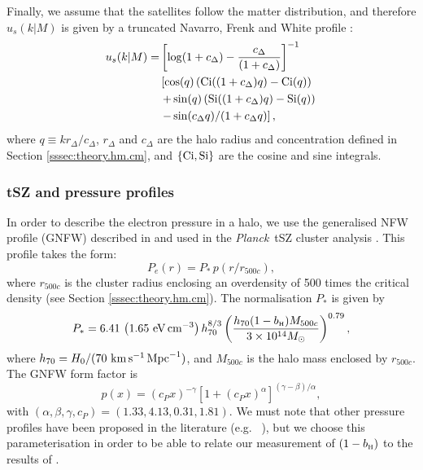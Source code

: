 \documentclass[useAMS,usenatbib]{mn2e}
\def\bH{b_{\scriptscriptstyle\rm H}}
\def\planck{{\it Planck\/}}
\def\citejap#1{\citeauthor{#1}\ \citeyear{#1}}
\begin{document}
      Finally, we assume that the satellites follow the matter distribution, and therefore $u_s(k|M)$ is given by a truncated Navarro, Frenk and White profile \citep{1996ApJ...462..563N}:
      \begin{align}
        u_s(k|M)=&\left[\log(1+c_\Delta)-\frac{c_\Delta}{(1+c_\Delta)}\right]^{-1}\\\nonumber
               &\left[\cos(q)\left({\rm Ci}((1+c_\Delta)q)-{\rm Ci}(q)\right)\right.\\\nonumber
               &\left.+\sin(q)\left({\rm Si}((1+c_\Delta)q)-{\rm Si}(q)\right)\right.\\\nonumber
               &\left.-\sin(c_\Delta q)/(1+c_\Delta q)\right],
      \end{align}
      where $q\equiv kr_\Delta/c_\Delta$, $r_\Delta$ and $c_\Delta$ are the halo radius and concentration defined in Section \ref{sssec:theory.hm.cm}, and $\{{\rm Ci}, {\rm Si}\}$ are the cosine and sine integrals.
      
    \subsubsection{tSZ and pressure profiles}\label{sssec:theory.hm.pe}
      In order to describe the electron pressure in a halo, we use the generalised NFW profile (GNFW) described in \cite{2010A&A...517A..92A} and used in the \planck\ tSZ cluster analysis \cite{2016A&A...594A..24P}. This profile takes the form:
      \begin{equation}
        P_e(r)=P_*\,p(r/r_{500c}),
      \end{equation}
      where $r_{500c}$ is the cluster radius enclosing an overdensity of 500 times the critical density (see Section \ref{sssec:theory.hm.cm}). The normalisation $P_*$ is given by
      \begin{equation}\label{eq:arnaud_norm}
        P_*=6.41\,\left(1.65\,\, {\rm eV}\,{\rm cm}^{-3}\right)h_{70}^{8/3}
        \left(\frac{h_{70}(1-\bH)M_{500c}}{3\times10^{14}M_\odot}\right)^{0.79},
      \end{equation}
      where $h_{70}=H_0/(70\ {\rm km}\,{\rm s}^{-1}\,{\rm Mpc}^{-1})$, and $M_{500c}$ is the halo mass enclosed by $r_{500c}$. The GNFW form factor is
      \begin{equation}
        p(x)=(c_P x)^{-\gamma}\left[1+(c_P x)^\alpha\right]^{(\gamma-\beta)/\alpha},
      \end{equation}
      with $(\alpha,\beta,\gamma,c_P)=(1.33,4.13,0.31,1.81)$. We must note that other pressure profiles have been proposed in the literature (e.g. \citejap{2012ApJ...758...75B}), but we choose this parameterisation in order to be able to relate our measurement of $(1-\bH)$ to the results of \cite{2016A&A...594A..24P}.
      
\end{document}
